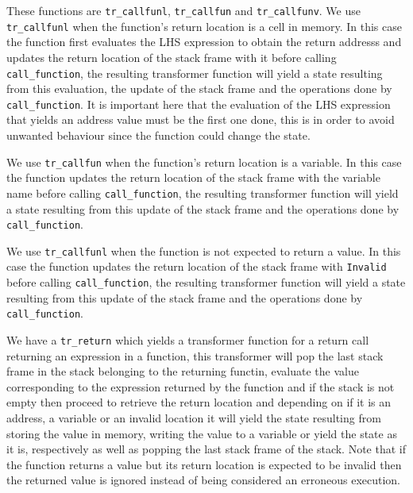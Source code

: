 These functions are \verb|tr_callfunl|, \verb|tr_callfun| and \verb|tr_callfunv|.
We use \verb|tr_callfunl| when the function's return location is a cell in memory.
In this case the function first evaluates the LHS expression to obtain the return addresss and updates the return location of the stack frame with it before calling \verb|call_function|, the resulting transformer function will yield a state resulting from this evaluation, the update of the stack frame and the operations done by \verb|call_function|.
It is important here that the evaluation of the LHS expression that yields an address value must be the first one done, this is in order to avoid unwanted behaviour since the function could change the state.

\begin{comment}
You can do a better job at clarifying this!
\end{comment}

We use \verb|tr_callfun| when the function's return location is a variable.
In this case the function updates the return location of the stack frame with the variable name before calling \verb|call_function|, the resulting transformer function will yield a state resulting from this update of the stack frame and the operations done by \verb|call_function|.

We use \verb|tr_callfunl| when the function is not expected to return a value.
In this case the function updates the return location of the stack frame with \verb|Invalid| before calling \verb|call_function|, the resulting transformer function will yield a state resulting from this update of the stack frame and the operations done by \verb|call_function|.

We have a \verb|tr_return| which yields a transformer function for a return call returning an expression in a function, this transformer will pop the last stack frame in the stack belonging to the returning functin, evaluate the value corresponding to the expression returned by the function and if the stack is not empty then proceed to retrieve the return location and depending on if it is an address, a variable or an invalid location it will yield the state resulting from storing the value in memory, writing the value to a variable or yield the state as it is, respectively as well as popping the last stack frame of the stack.
Note that if the function returns a value but its return location is expected to be invalid then the returned value is ignored instead of being considered an erroneous execution.

